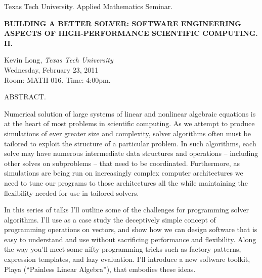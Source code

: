 \documentclass[oneside]{amsart}
\newcommand{\talktitle}{Building a better solver: software engineering aspects of 
high-performance scientific computing. II.}
\newcommand{\talkspeaker}{ {\sc Kevin Long}, \textit{Texas Tech University}}
\newcommand{\talkdate}{Wednesday, February 23, 2011}
\newcommand{\timelocation}{Room: MATH 016.  Time: 4:00pm.}
\newcommand{\talkabstract}{
{\Huge Numerical solution of large systems of linear and nonlinear algebraic 
equations is at the heart of most problems in scientific computing. As we 
attempt to produce simulations of ever greater size and complexity, solver 
algorithms often must be tailored to exploit the structure of a particular 
problem. In such algorithms, each solve may have numerous
intermediate data structures and operations -- including other solves on subproblems -- that 
need to be coordinated. Furthermore, as simulations are being run on 
increasingly complex computer architectures we need to tune our programs to 
those architectures all the while maintaining the flexibility needed for use 
in tailored solvers.}

{\Huge
In this series of talks I'll outline some of the challenges for programming 
solver algorithms. I'll use as a case study the deceptively simple concept of 
programming operations on vectors, and show how we can design  software that 
is easy to understand and use without sacrificing performance and 
flexibility. Along the way you'll meet some nifty programming tricks such as 
factory patterns, expression templates, and lazy evaluation. I'll introduce a 
new software toolkit, Playa (``Painless Linear Algebra''), that embodies these 
ideas. 
}
}
\begin{document}
\thispagestyle{empty}

\begin{center}
Texas Tech University.  Applied Mathematics Seminar.
\end{center}

\begin{center}

\textbf{\Huge {\uppercase{\talktitle}} }

{\Large
\talkspeaker\\
\talkdate\\
\timelocation
}
\end{center}

\vspace*{10pt}

{\LARGE
ABSTRACT.}
{\talkabstract}
\end{document}
